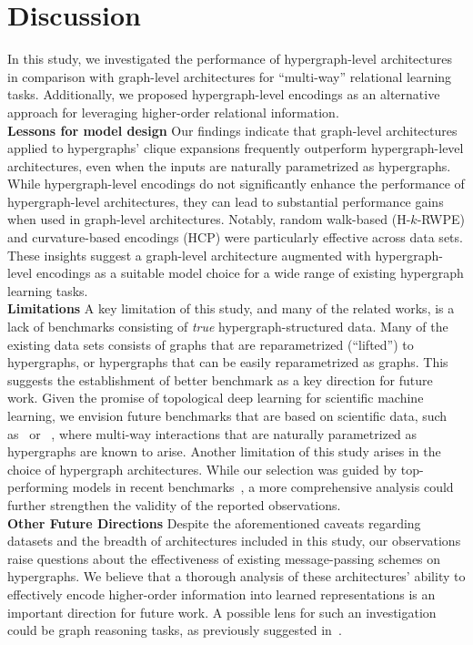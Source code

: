 \section{Discussion}\label{discussion}
In this study, we investigated the performance of hypergraph-level architectures in comparison with graph-level architectures for “multi-way” relational learning tasks. Additionally, we proposed hypergraph-level encodings as an alternative approach for leveraging higher-order relational information.\\

\noindent \textbf{Lessons for model design}
Our findings indicate that graph-level architectures applied to hypergraphs' clique expansions frequently outperform hypergraph-level architectures, even when the inputs are naturally parametrized as hypergraphs. While hypergraph-level encodings do not significantly enhance the performance of hypergraph-level architectures, they can lead to substantial performance gains when used in graph-level architectures. Notably, random walk-based (H-$k$-RWPE) and curvature-based encodings (HCP) were particularly effective across data sets. These insights suggest a graph-level architecture augmented with hypergraph-level encodings as a suitable model choice for a wide range of existing hypergraph learning tasks.\\

\noindent \textbf{Limitations} 
A key limitation of this study, and many of the related works, is a lack of benchmarks consisting of \emph{true} hypergraph-structured data. Many of the existing data sets consists of graphs that are reparametrized (``lifted'') to hypergraphs, or hypergraphs that can be easily reparametrized as graphs. This suggests the establishment of better benchmark as a key direction for future work. Given the promise of topological deep learning for scientific machine learning, we envision future benchmarks that are based on scientific data, such as~\citep{garcia2023chemically} or ~\citep{gjorgjieva2011triplet}, where multi-way interactions that are naturally parametrized as hypergraphs are known to arise.
Another limitation of this study arises in the choice of hypergraph architectures. While our selection was guided by top-performing models in recent benchmarks~\citep{huang2021unignn,telyatnikov2024topobenchmark}, a more comprehensive analysis could further strengthen the validity of the reported observations.\\

\noindent \textbf{Other Future Directions} 
Despite the aforementioned caveats regarding datasets and the breadth of architectures included in this study, our observations raise questions about the effectiveness of existing message-passing schemes on hypergraphs. We believe that a thorough analysis of these architectures’ ability to effectively encode higher-order information into learned representations is an important direction for future work. A possible lens for such an investigation could be graph reasoning tasks, as previously suggested in~\citep{luo2023expressiveness}. 

